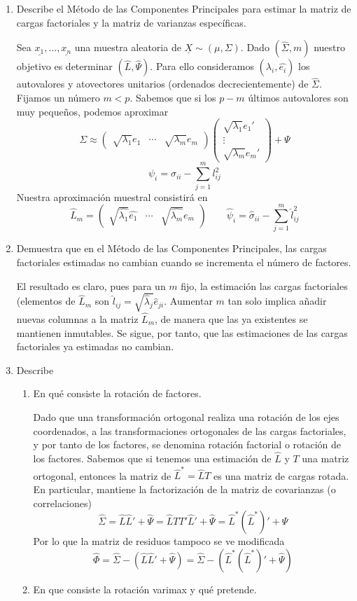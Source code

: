 \documentclass[twoside]{article}
\newcommand{\muestra}[1]{{\underline{#1}}}
\newcommand{\mX}{{\muestra{X}}}
\begin{document}
\begin{enumerate}
\item Describe el Método de las Componentes Principales para estimar la matriz de cargas factoriales y la matriz de varianzas específicas.

Sea $\muestra{x_1},\dotsc,\muestra{x_n}$ una muestra aleatoria de $\mX\sim (\mu,\Sigma)$. Dado $(\hat{\Sigma},m)$ nuestro objetivo es determinar $(\hat{L},\hat{\Psi})$. Para ello consideramos $(\hat{\lambda_i},\hat{e_i})$ los autovalores y atovectores unitarios (ordenados decrecientemente) de $\hat{\Sigma}$. Fijamos un número $m<p$. Sabemos que si los $p-m$ últimos autovalores son muy pequeños, podemos aproximar
$$
\Sigma  \approx \begin{pmatrix}
\sqrt{\lambda_1}e_1 & \cdots & \sqrt{\lambda_m}e_m 
\end{pmatrix}
\begin{pmatrix}
\sqrt{\lambda_1}e_1' \\ \vdots \\ \sqrt{\lambda_m}e_m'
\end{pmatrix} + \Psi
$$
$$
\psi_i = \sigma_{ii}-\sum_{j=1}^m l_{ij}^2
$$
Nuestra aproximación muestral consistirá en $$\hat{L}_m=\begin{pmatrix}
\sqrt{\hat{\lambda_1}}\hat{e_1} & \cdots & \sqrt{\hat{\lambda_m}}\hat{e_m}\end{pmatrix} \qquad 	\hat{\psi}_i = \hat{\sigma}_{ii}-\sum_{j=1}^m \hat{l}_{ij}^2
$$
\item Demuestra que en el Método de las Componentes Principales, las cargas factoriales estimadas no cambian cuando se incrementa el número de factores.

El resultado es claro, pues para un $m$ fijo, la estimación las cargas factoriales (elementos de $\hat{L}_m$ son $\hat{l}_{ij}=\sqrt{\hat{\lambda}_j}\hat{e}_{ji}$. Aumentar $m$ tan solo implica añadir nuevas columnas a la matriz $\hat{L}_m$, de manera que las ya existentes se mantienen inmutables. Se sigue, por tanto, que las estimaciones de las cargas factoriales ya estimadas no cambian.
\item Describe
\begin{enumerate}
	\item En qué consiste la rotación de factores.

	Dado que una transformación ortogonal realiza una rotación de los ejes coordenados, a las transformaciones ortogonales de las cargas factoriales, y por tanto de los factores, se denomina rotación factorial o rotación de los factores. Sabemos que si tenemos una estimación de $\hat{L}$ y $T$ una matriz ortogonal, entonces la matriz de $\hat{L}^* = \hat{L}T$ es una matriz de cargas rotada. En particular, mantiene la factorización de la matriz de covarianzas (o correlaciones)
	$$
	\hat{\Sigma} = \hat{L}\hat{L}' + \hat{\Psi} = \hat{L}TT'\hat{L}' + \hat{\Psi} = \hat{L}^*(\hat{L}^*)'+\Psi
	$$ 
Por lo que la matriz de residuos tampoco se ve modificada
$$
\hat{\Phi} = \hat{\Sigma} -( \hat{L}\hat{L}' + \hat{\Psi}) =  \hat{\Sigma} -(\hat{L}^*(\hat{L}^*)' + \hat{\Psi})
$$
	\item En que consiste la rotación varimax y qué pretende.
	

\end{enumerate}
\end{enumerate}
\end{document}
